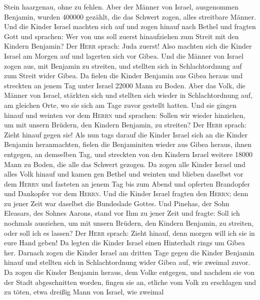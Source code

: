 Stein haargenau, ohne zu fehlen.  Aber der Männer von
Israel, ausgenommen Benjamin, wurden 400000 gezählt, die das Schwert
zogen, alles streitbare Männer.  Und die Kinder Israel
machten sich auf und zogen hinauf nach Bethel und fragten Gott und
sprachen: Wer von uns soll zuerst hinaufziehen zum Streit mit den
Kindern Benjamin? Der \textsc{Herr} sprach: Juda zuerst! 
Also machten sich die Kinder Israel am Morgen auf und lagerten sich vor
Gibea.  Und die Männer von Israel zogen aus, mit Benjamin
zu streiten, und stellten sich in Schlachtordnung auf zum Streit wider
Gibea.  Da fielen die Kinder Benjamin aus Gibea heraus
und streckten an jenem Tag unter Israel 22000 Mann zu Boden.
 Aber das Volk, die Männer von Israel, stärkten sich und
stellten sich wieder in Schlachtordnung auf, am gleichen Orte, wo sie
sich am Tage zuvor gestellt hatten.  Und sie gingen
hinauf und weinten vor dem \textsc{Herrn} und sprachen: Sollen wir
wieder hinziehen, um mit unsern Brüdern, den Kindern Benjamin, zu
streiten? Der \textsc{Herr} sprach: Zieht hinauf gegen sie!
 Als nun tags darauf die Kinder Israel sich an die Kinder
Benjamin heranmachten,  fielen die Benjaminiten wieder
aus Gibea heraus, ihnen entgegen, an demselben Tag, und streckten von
den Kindern Israel weitere 18000 Mann zu Boden, die alle das Schwert
gezogen.  Da zogen alle Kinder Israel und alles Volk
hinauf und kamen gen Bethel und weinten und blieben daselbst vor dem
\textsc{Herrn} und fasteten an jenem Tag bis zum Abend und opferten
Brandopfer und Dankopfer vor dem \textsc{Herrn}.  Und die
Kinder Israel fragten den \textsc{Herrn}; denn zu jener Zeit war
daselbst die Bundeslade Gottes.  Und Pinehas, der Sohn
Eleasars, des Sohnes Aarons, stand vor Ihm zu jener Zeit und fragte:
Soll ich nochmals ausziehen, um mit unsern Brüdern, den Kindern
Benjamin, zu streiten, oder soll ich es lassen? Der \textsc{Herr}
sprach: Zieht hinauf, denn morgen will ich sie in eure Hand geben!
 Da legten die Kinder Israel einen Hinterhalt rings um
Gibea her.  Darnach zogen die Kinder Israel am dritten
Tage gegen die Kinder Benjamin hinauf und stellten sich in
Schlachtordnung wider Gibea auf, wie zweimal zuvor.  Da
zogen die Kinder Benjamin heraus, dem Volke entgegen, und nachdem sie
von der Stadt abgeschnitten worden, fingen sie an, etliche vom Volk zu
erschlagen und zu töten, etwa dreißig Mann von Israel, wie zweimal
